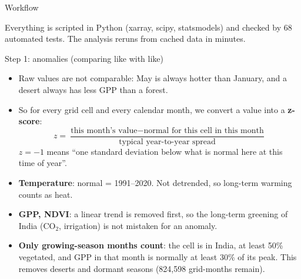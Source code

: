 \documentclass[11pt,aspectratio=169]{beamer}
\begin{document}
\begin{frame}{Workflow}
  \centering

  \vspace{10pt}
  \footnotesize Everything is scripted in Python (xarray, scipy, statsmodels)
  and checked by 68 automated tests. The analysis reruns from cached data in
  minutes.
\end{frame}

\begin{frame}{Step 1: anomalies (comparing like with like)}
  \small
  \begin{itemize}
    \item Raw values are not comparable: May is always hotter than January,
      and a desert always has less GPP than a forest.
    \item So for every grid cell and every calendar month, we convert a value
      into a \textbf{z-score}:
      \[
        z = \frac{\text{this month's value} - \text{normal for this cell in this month}}
                 {\text{typical year-to-year spread}}
      \]
      $z = -1$ means ``one standard deviation below what is normal here at
      this time of year''.
    \item \textbf{Temperature}: normal = 1991--2020. Not detrended, so
      long-term warming counts as heat.
    \item \textbf{GPP, NDVI}: a linear trend is removed first, so the
      long-term greening of India (CO$_2$, irrigation) is not mistaken for
      an anomaly.
    \item \textbf{Only growing-season months count}: the cell is in India,
      at least 50\% vegetated, and GPP in that month is normally at least
      30\% of its peak. This removes deserts and dormant seasons
      (824,598 grid-months remain).
  \end{itemize}
\end{frame}
\end{document}
